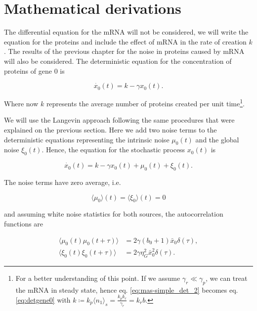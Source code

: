 \section{Mathematical derivations}

The differential equation for the mRNA will not be considered, we will write the equation for the proteins and include the effect of mRNA in the rate of creation $k$. The results of the previous chapter for the noise in proteins caused by mRNA will also be considered. The deterministic equation for the concentration of proteins of gene $0$ is 

\begin{equation}
\label{eq:detgene0}
\dot{x_0}(t) = k - \gamma x_0(t).
\end{equation}

Where now $k$ represents the average number of proteins created per unit time\footnote{For a better understanding of this point. If we assume $\gamma_r\ll\gamma_p$, we can treat the mRNA in steady state, hence eq. \eqref{eq:mas-simple_det_2} becomes eq. \eqref{eq:detgene0} with $k \coloneqq k_p\langle n_1\rangle_s =  \frac{k_pk_r}{\gamma_r} = k_rb$.}.

We will use the Langevin approach following the same procedures that were explained on the previous section. Here we add two noise terms to the deterministic equations representing the intrinsic noise $\mu_0(t)$ and the global noise $\xi_0(t)$. Hence, the equation for the stochastic process $x_0(t)$ is

\begin{equation}
\label{eq:gene0}
\dot{x_0}(t) = k - \gamma x_0(t) + \mu_0(t) + \xi_0(t).
\end{equation}

The noise terms have zero average, i.e.

\begin{equation*}
\langle\mu_0\rangle(t) = \langle\xi_0\rangle(t) = 0
\end{equation*}

and assuming white noise statistics for both sources, the autocorrelation functions are

\begin{align}
\langle\mu_0(t)\mu_0(t+\tau)\rangle&=2\gamma(b_0+1)\bar{x}_0\delta(\tau),\label{eq:corin0}\\
\langle\xi_0(t)\xi_0(t+\tau)\rangle&=2\gamma\eta_G^2\bar{x}_0^2\delta(\tau). \label{eq:corex0}
\end{align}


